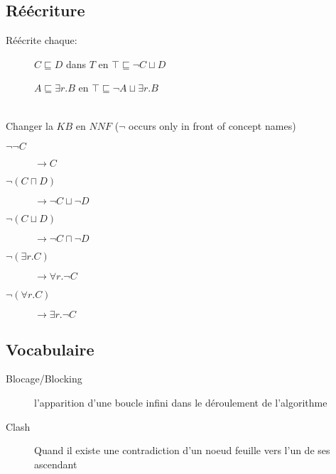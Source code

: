 \subsection{Réécriture}
Réécrite chaque:
\begin{description}
\item[] $C \sqsubseteq D$ dans $T$ en $\top \sqsubseteq \neg C \sqcup D$
\item[] $A \sqsubseteq \exists r.B$ en $\top \sqsubseteq \neg A \sqcup \exists r.B$
\end{description}
\ \\
Changer la $KB$ en $NNF$ ($\neg$ occurs only in front of concept names)
\begin{description}
\item[$\neg \neg C$] $\rightarrow C$
\item[$\neg (C \sqcap D)$] $\rightarrow \neg C \sqcup \neg D$
\item[$\neg (C \sqcup D)$] $\rightarrow \neg C \sqcap \neg D$
\item[$\neg (\exists r.C)$] $\rightarrow \forall r.\neg C$
\item[$\neg (\forall r.C)$] $\rightarrow \exists r.\neg C$
\end{description}

\subsection{Vocabulaire}
\begin{description}
\item[Blocage/Blocking] l'apparition d'une boucle infini dans le déroulement de l'algorithme 
\item[Clash] Quand il existe une contradiction d'un noeud feuille vers l'un de ses ascendant
\end{description}
\pagebreak
